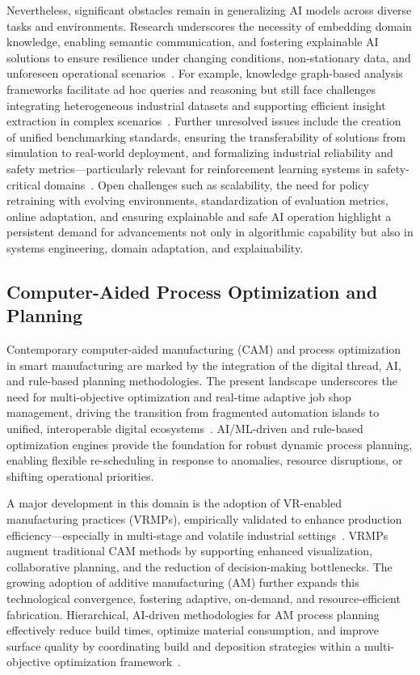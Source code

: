 \documentclass[sigconf]{acmart}
\begin{document}
Nevertheless, significant obstacles remain in generalizing AI models across diverse tasks and environments. Research underscores the necessity of embedding domain knowledge, enabling semantic communication, and fostering explainable AI solutions to ensure resilience under changing conditions, non-stationary data, and unforeseen operational scenarios~\cite{ref37,ref41}. For example, knowledge graph-based analysis frameworks facilitate ad hoc queries and reasoning but still face challenges integrating heterogeneous industrial datasets and supporting efficient insight extraction in complex scenarios~\cite{ref44}. Further unresolved issues include the creation of unified benchmarking standards, ensuring the transferability of solutions from simulation to real-world deployment, and formalizing industrial reliability and safety metrics—particularly relevant for reinforcement learning systems in safety-critical domains~\cite{ref38,ref56}. Open challenges such as scalability, the need for policy retraining with evolving environments, standardization of evaluation metrics, online adaptation, and ensuring explainable and safe AI operation highlight a persistent demand for advancements not only in algorithmic capability but also in systems engineering, domain adaptation, and explainability.

\subsection{Computer-Aided Process Optimization and Planning}

Contemporary computer-aided manufacturing (CAM) and process optimization in smart manufacturing are marked by the integration of the digital thread, AI, and rule-based planning methodologies. The present landscape underscores the need for multi-objective optimization and real-time adaptive job shop management, driving the transition from fragmented automation islands to unified, interoperable digital ecosystems~\cite{ref4,ref11,ref16,ref18,ref19,ref20,ref27,ref28,ref29,ref30,ref38,ref44,ref45,ref49,ref51,ref55,ref59,ref60,ref61,ref70}. AI/ML-driven and rule-based optimization engines provide the foundation for robust dynamic process planning, enabling flexible re-scheduling in response to anomalies, resource disruptions, or shifting operational priorities.

A major development in this domain is the adoption of VR-enabled manufacturing practices (VRMPs), empirically validated to enhance production efficiency—especially in multi-stage and volatile industrial settings~\cite{ref83}. VRMPs augment traditional CAM methods by supporting enhanced visualization, collaborative planning, and the reduction of decision-making bottlenecks. The growing adoption of additive manufacturing (AM) further expands this technological convergence, fostering adaptive, on-demand, and resource-efficient fabrication. Hierarchical, AI-driven methodologies for AM process planning effectively reduce build times, optimize material consumption, and improve surface quality by coordinating build and deposition strategies within a multi-objective optimization framework~\cite{ref2,ref5,ref6,ref7,ref15,ref20,ref27,ref44,ref47,ref48,ref52,ref58,ref59,ref69,ref84}.
\end{document}
